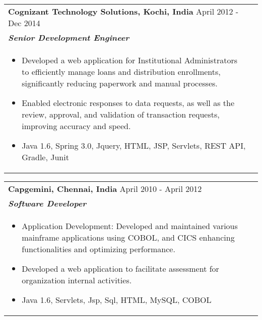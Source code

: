\documentclass[a4paper,8pt]{article}
\begin{document}
\begin{tabularx}{\linewidth}{ @{}l r@{} }
\color[HTML]{1C033C} \textbf{{Cognizant Technology Solutions, Kochi, India}} \hfill \color[HTML]{371e77} April 2012 - Dec 2014 \\[4pt]
\color[HTML]{371e77}\textbf{\textit{Senior Development Engineer}}\ \hfill \color[HTML]{4B28A4} \\[5pt]
\begin{minipage}[t]{\linewidth}
    \begin{itemize}[nosep,after=\strut, leftmargin=2em, itemsep=2pt]
        \item Developed a web application for Institutional Administrators to efficiently manage loans and distribution enrollments, significantly reducing paperwork and manual processes.
        \item Enabled electronic responses to data requests, as well as the review, approval, and validation of transaction requests, improving accuracy and speed.
        \item Java 1.6, Spring 3.0, Jquery, HTML, JSP, Servlets, REST API, Gradle, Junit       
    \end{itemize}
\end{minipage}
\end{tabularx}

\begin{tabularx}{\linewidth}{ @{}l r@{} }
\color[HTML]{1C033C} \textbf{Capgemini, Chennai, India} \hfill \color[HTML]{371e77} April 2010 - April 2012 \\ [4pt]
\color[HTML]{371e77}\textbf{\textit{Software Developer}} \hfill \color[HTML]{4B28A4} \\[5pt]
\begin{minipage}[t]{\linewidth}
    \begin{itemize}[nosep,after=\strut, leftmargin=2em, itemsep=2pt]
        \item Application Development: Developed and maintained various mainframe applications using COBOL, and CICS enhancing functionalities and optimizing performance. 
        \item Developed a web application to facilitate assessment for organization internal activities.
        \item Java 1.6, Servlets, Jsp, Sql, HTML, MySQL, COBOL
    \end{itemize}
    \end{minipage}
\end{tabularx}\\[3pt]
\end{document}
